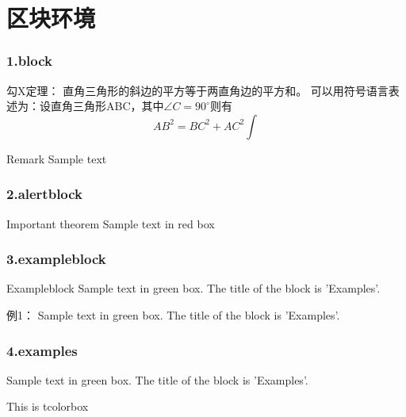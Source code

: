 \begin{frame}
  \frametitle{}
  \centering
\end{frame}

\section{区块环境}

\begin{frame}\frametitle{1.block}
	\begin{block}{勾X定理：}
		直角三角形的斜边的平方等于两直角边的平方和。
		可以用符号语言表述为：设直角三角形ABC，其中$\angle C=90^\circ $则有
		\begin{equation}
			AB^2=BC^2+AC^2 \int
		\end{equation}
	\end{block}
	\begin{block}{Remark}
		Sample text
	\end{block}
\end{frame}

\begin{frame}
    \frametitle{2.alertblock}
	\begin{alertblock}{Important theorem}
		Sample text in red box
	\end{alertblock}
\end{frame}

\begin{frame}
    \frametitle{3.exampleblock}
	\begin{exampleblock} {Exampleblock}
		Sample text in green box. The title of the block is 'Examples'.
	\end{exampleblock}
    \begin{exampleblock} {例1：}
		Sample text in green box. The title of the block is 'Examples'.
	\end{exampleblock}
\end{frame}

\begin{frame}
    \frametitle{4.examples}
	\begin{examples}
		Sample text in green box. The title of the block is 'Examples'.
	\end{examples}
  \begin{tcolorbox}[title=5.tcolorbox,colframe=red!75!black]
    This is tcolorbox
  \end{tcolorbox}
\end{frame}

